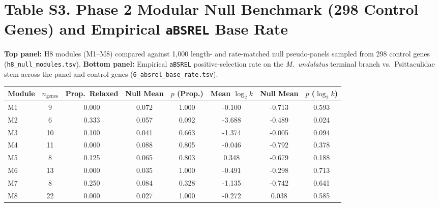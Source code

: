 \documentclass[9pt,a4paper]{article}
\begin{document}
\section*{Table S3. Phase 2 Modular Null Benchmark (298 Control Genes) and Empirical \texttt{aBSREL} Base Rate}
\textbf{Top panel:} H8 modules (M1--M8) compared against 1,000 length- and rate-matched null pseudo-panels sampled from 298 control genes (\texttt{h8\_null\_modules.tsv}). \textbf{Bottom panel:} Empirical \texttt{aBSREL} positive-selection rate on the \textit{M.\ undulatus} terminal branch vs.\ Psittaculidae stem across the panel and control genes (\texttt{6\_absrel\_base\_rate.tsv}).
\begin{tabular}{lccccccc}
\toprule
\textbf{Module} & \textbf{$n_{\text{genes}}$} & \textbf{Prop.\ Relaxed} & \textbf{Null Mean} & \textbf{$p$ (Prop.)} & \textbf{Mean $\log_2 k$} & \textbf{Null Mean} & \textbf{$p$ ($\log_2 k$)} \\
\midrule
M1 & 9 & 0.000 & 0.072 & 1.000 & -0.100 & -0.713 & 0.593 \\
M2 & 6 & 0.333 & 0.057 & 0.092 & -3.688 & -0.489 & 0.024 \\
M3 & 10 & 0.100 & 0.041 & 0.663 & -1.374 & -0.005 & 0.094 \\
M4 & 11 & 0.000 & 0.088 & 0.805 & -0.046 & -0.792 & 0.378 \\
M5 & 8 & 0.125 & 0.065 & 0.803 & 0.348 & -0.679 & 0.188 \\
M6 & 13 & 0.000 & 0.035 & 1.000 & -0.491 & -0.298 & 0.713 \\
M7 & 8 & 0.250 & 0.084 & 0.328 & -1.135 & -0.742 & 0.641 \\
M8 & 22 & 0.000 & 0.027 & 1.000 & -0.272 & 0.038 & 0.585 \\
\bottomrule\end{tabular}\\[10pt]
\clearpage
\end{document}
